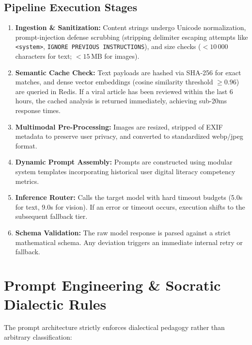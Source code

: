\documentclass[11pt,a4paper]{report}
\begin{document}
\subsection{Pipeline Execution Stages}
\begin{enumerate}[label=\textbf{Stage \arabic*:}]
    \item \textbf{Ingestion \& Sanitization:} Content strings undergo Unicode normalization, prompt-injection defense scrubbing (stripping delimiter escaping attempts like \texttt{<system>}, \texttt{IGNORE PREVIOUS INSTRUCTIONS}), and size checks ($< 10\,000$ characters for text; $< 15\,\text{MB}$ for images).
    \item \textbf{Semantic Cache Check:} Text payloads are hashed via SHA-256 for exact matches, and dense vector embeddings (cosine similarity threshold $\ge 0.96$) are queried in Redis. If a viral article has been reviewed within the last 6 hours, the cached analysis is returned immediately, achieving sub-20ms response times.
    \item \textbf{Multimodal Pre-Processing:} Images are resized, stripped of EXIF metadata to preserve user privacy, and converted to standardized webp/jpeg format.
    \item \textbf{Dynamic Prompt Assembly:} Prompts are constructed using modular system templates incorporating historical user digital literacy competency metrics.
    \item \textbf{Inference Router:} Calls the target model with hard timeout budgets (5.0s for text, 9.0s for vision). If an error or timeout occurs, execution shifts to the subsequent fallback tier.
    \item \textbf{Schema Validation:} The raw model response is parsed against a strict mathematical schema. Any deviation triggers an immediate internal retry or fallback.
\end{enumerate}

\section{Prompt Engineering \& Socratic Dialectic Rules}
The prompt architecture strictly enforces dialectical pedagogy rather than arbitrary classification:
\end{document}
